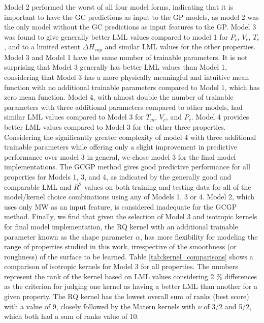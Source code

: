 \documentclass[journal=jacsat,manuscript=article, ]{achemso}
\begin{document}
Model 2 performed the worst of all four model forms, indicating that it is important to have the GC predictions as input to the GP models, as model 2 was the only model without the GC predictions as input features to the GP. Model 3 was found to give generally better LML values compared to model 1 for $P_c$, $V_c$, $T_c$, and to a limited extent $\Delta H_{vap}$  and similar LML values for the other properties. 
Model 3 and Model 1 have the same number of trainable parameters. It is not surprising that Model 3 generally has better LML values than Model 1, considering that Model 3 has a more physically meaningful and intuitive mean function with no additional trainable parameters compared to Model 1, which has zero mean function.
Model 4, with almost double the number of trainable parameters with three additional parameters compared to other models, had similar LML values compared to Model 3 for $T_m$, $V_c$, and $P_c$. Model 4 provides better LML values compared to Model 3 for the other three properties. 
Considering the significantly greater complexity of model 4 with three additional trainable parameters while offering only a slight improvement in predictive performance over model 3 in general, we chose model 3 for the final model implementations.
The GCGP method gives good predictive performance for all properties for Models 1, 3, and 4, as indicated by the generally good and comparable LML and $R^2$ values on both training and testing data for all of the model/kernel choice combinations using any of Models 1, 3 or 4. Model 2, which uses only MW as an input feature, is considered inadequate for the GCGP method.
Finally, we find that given the selection of Model 3 and isotropic kernels for final model implementation, the RQ kernel with an additional trainable parameter known as the shape parameter $\alpha$, has more flexibility for modeling the range of properties studied in this work, irrespective of the smoothness (or roughness) of the surface to be learned.
Table \ref{tab:kernel_comparisons} shows a comparison of isotropic kernels for Model 3 for all properties. The numbers represent the rank of the kernel based on LML values considering 2 \% differences as the criterion for judging one kernel as having a better LML than another for a given property. 
The RQ kernel has the lowest overall sum of ranks (best score) with a value of 9, closely followed by the Matern kernels with $\nu$ of 3/2 and 5/2, which both had a sum of ranks value of 10. 
\end{document}
